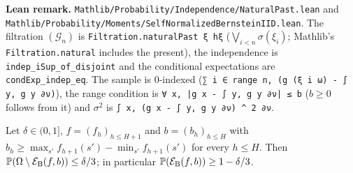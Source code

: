 \textbf{Lean remark.} \texttt{Mathlib/Probability/Independence/NaturalPast.lean} and
\texttt{Mathlib/Probability/Moments/SelfNormalizedBernsteinIID.lean}. The filtration $(\mathcal G_n)$
is \texttt{Filtration.naturalPast ξ hξ} ($\bigvee_{i < n} \sigma(\xi_i)$; Mathlib's
\texttt{Filtration.natural} includes the present), the independence is
\texttt{indep\_iSup\_of\_disjoint} and the conditional expectations are \texttt{condExp\_indep\_eq}.
The sample is $0$-indexed (\texttt{∑ i ∈ range n, (g (ξ i ω) - ∫ y, g y ∂ν)}), the range condition
is \texttt{∀ x, |g x - ∫ y, g y ∂ν| ≤ b} ($b \ge 0$ follows from it) and $\sigma^2$ is
\texttt{∫ x, (g x - ∫ y, g y ∂ν) \^{} 2 ∂ν}.

\begin{lemma}\label{lem:event_bern_prob}
\leanok
{}
Let $\delta \in (0, 1]$, $f = (f_h)_{h \le H + 1}$ and $b = (b_h)_{h \le H}$ with
$b_h \ge \max_{s'} f_{h+1}(s') - \min_{s'} f_{h+1}(s')$ for every $h \le H$. Then
$\mathbb{P}(\Omega \setminus \mathcal{E}_{\mathrm{B}}(f, b)) \le \delta/3$; in particular $\mathbb{P}(\mathcal{E}_{\mathrm{B}}(f, b)) \ge 1 - \delta/3$.
\end{lemma}

